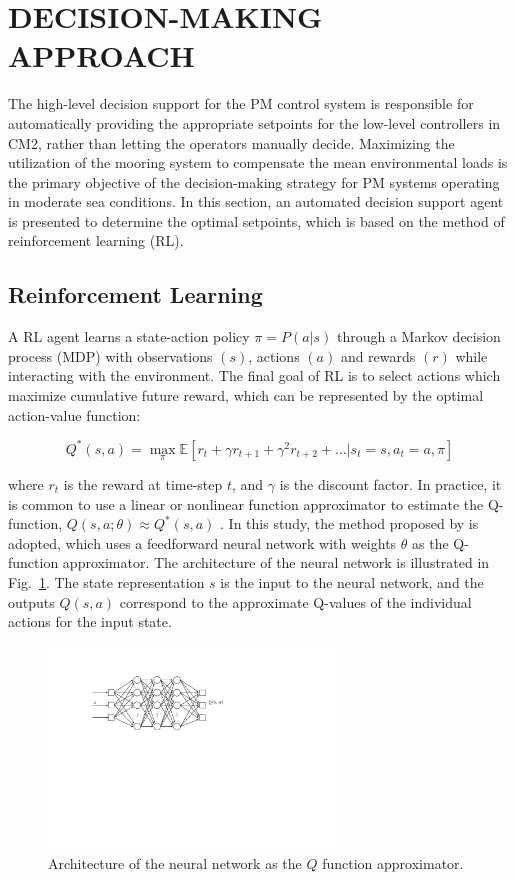 \begin{sloppypar}
\section{DECISION-MAKING APPROACH}
The high-level decision support for the PM control system is responsible for automatically providing the appropriate setpoints for the low-level controllers in CM2, rather than letting the operators manually decide. Maximizing the utilization of the mooring system to compensate the mean environmental loads is the primary objective of the decision-making strategy for PM systems operating in moderate sea conditions. In this section, an automated decision support agent is presented to determine the optimal setpoints, which is based on the method of reinforcement learning (RL).

\subsection{Reinforcement Learning}
A RL agent learns a state-action policy $\pi = P(a|s)$ through a Markov decision process (MDP) with observations $(s)$, actions $(a)$ and rewards $(r)$ while interacting with the environment. The final goal of RL is to select actions which maximize cumulative future reward, which can be represented by the optimal action-value function:

\begin{equation}
Q^*(s,a) = \max_\pi \mathbb{E} \left[ r_t + \gamma r_{t+1} + \gamma^2 r_{t+2} + \dots | s_t=s, a_t = a, \pi \right]
\end{equation}

\noindent where $r_t$ is the reward at time-step $t$, and $\gamma$ is the discount factor. In practice, it is common to use a linear or nonlinear function approximator to estimate the Q-function, $Q(s,a;\theta)\approx Q^*(s,a)$ \cite{sutton1999reinforcement}. In this study, the method proposed by \cite{mnih2015human-level} is adopted, which uses a feedforward neural network with weights $\theta$ as the Q-function approximator. The architecture of the neural network is illustrated in Fig.~\ref{fig:neural_network}. The state representation $s$ is the input to the neural network, and the outputs $Q(s,a)$ correspond to the approximate Q-values of the individual actions for the input state.

\begin{figure}[htbp]
	\centering\includegraphics[width=3.0in]{Images/ann}
	\caption{Architecture of the neural network as the $Q$ function approximator.}
	\label{fig:neural_network}
\end{figure}


\end{sloppypar}
